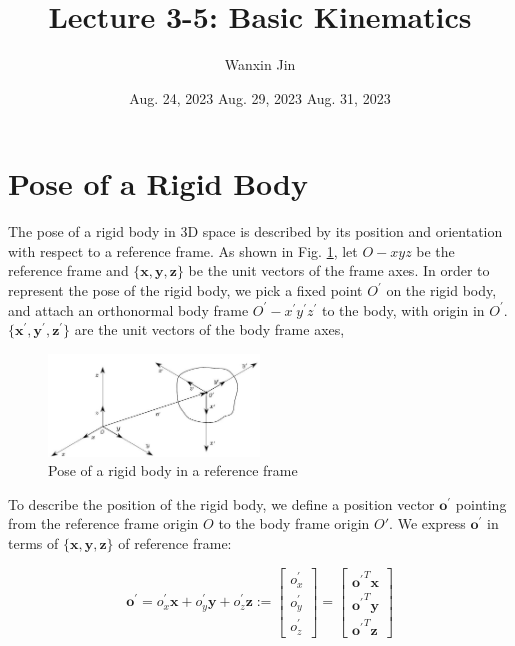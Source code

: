 \documentclass[10pt]{article}
\begin{document}
\title{Lecture 3-5: Basic Kinematics}
\date{Aug. 24, 2023 \quad  Aug. 29, 2023 \quad  Aug. 31, 2023}
\author{Wanxin Jin}
\maketitle




\section{Pose of a Rigid Body}
The pose of a rigid body in 3D space is  described  by its position and orientation with respect to a reference frame.  As shown in Fig. \ref{fig.rbpos},  let $O- x y z$ be the reference frame and $\{\boldsymbol{x}, \boldsymbol{y}, \boldsymbol{z}\}$ be the unit vectors of the frame axes. In order to represent the pose of the rigid body, we pick a fixed point $O^\prime$ on the rigid body, and attach an orthonormal body frame $O^{\prime} - x^{\prime} y^{\prime} z^{\prime}$  to the body, with origin in $O^{\prime}$. $\{\boldsymbol{x}^{\prime}, \boldsymbol{y}^{\prime}, \boldsymbol{z}^{\prime}\}$  are the unit vectors of the body frame axes, 

\begin{figure}[h]
    \centering
    \includegraphics[max width=0.5\textwidth]{./kinematics/pose_rigid_body}
    \caption{Pose of a rigid body in a reference frame}
    \label{fig.rbpos}
\end{figure}



To describe the position of the rigid body, we define a position vector $\boldsymbol{o}^{\prime}$ pointing from the reference frame origin $O$ to the body frame origin $O'$. We express $\boldsymbol{o}^{\prime}$ in terms of $\{\boldsymbol{x}, \boldsymbol{y}, \boldsymbol{z}\}$ of reference frame:

$$
    \boldsymbol{o}^{\prime}=o_{x}^{\prime} \boldsymbol{x}+o_{y}^{\prime} \boldsymbol{y}+o_{z}^{\prime} \boldsymbol{z}
:=\left[\begin{array}{c}
o_{x}^{\prime} \\
o_{y}^{\prime} \\
o_{z}^{\prime}
\end{array}\right]
=\left[\begin{array}{c}
{\boldsymbol{o}^{\prime}}^T \boldsymbol{x} \\
{\boldsymbol{o}^{\prime}}^T \boldsymbol{y} \\
{\boldsymbol{o}^{\prime}}^T \boldsymbol{z}
\end{array}\right]
$$
\end{document}
